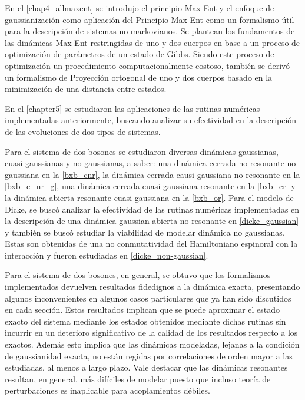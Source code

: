 \documentclass{report} %
\numberwithin{equation}{section}
\begin{document}
En el \autoref{chap4_allmaxent} se introdujo el principio Max-Ent y el enfoque de gaussianización como aplicación del Principio Max-Ent como un formalismo útil para la descripción de sistemas no markovianos. Se plantean los fundamentos de las dinámicas Max-Ent restringidas de uno y dos cuerpos en base a un proceso de optimización de parámetros de un estado de Gibbs. Siendo este proceso de optimización un procedimiento computacionalmente costoso, también se derivó un formalismo de Proyección ortogonal de uno y dos cuerpos basado en la minimización de una distancia entre estados. 

En el \autoref{chapter5} se estudiaron las aplicaciones de las rutinas numéricas implementadas anteriormente, buscando analizar su efectividad en la descripción de las evoluciones de dos tipos de sistemas.

Para el sistema de dos bosones se estudiaron diversas dinámicas gaussianas, cuasi-gaussianas y no gaussianas, a saber: una dinámica cerrada no resonante no gaussiana en la \autoref{bxb_cnr}, la dinámica cerrada causi-gaussiana no resonante en la \autoref{bxb_c_nr_g}, una dinámica cerrada cuasi-gaussiana resonante en la  \autoref{bxb_cr} y la dinámica abierta resonante cuasi-gaussiana en la  \autoref{bxb_or}. Para el modelo de Dicke, se buscó analizar la efectividad de las rutinas numéricas implementadas en la descripción de una dinámica gaussian abierta no resonante en \autoref{dicke_gaussian} y también se buscó estudiar la viabilidad de modelar dinámica no gaussianas. Estas son obtenidas de una no conmutatividad del Hamiltoniano espinoral con la interacción y fueron estudiadas en  \autoref{dicke_non-gaussian}.

Para el sistema de dos bosones, en general, se obtuvo que los formalismos implementados devuelven resultados fidedignos a la dinámica exacta, presentando algunos inconvenientes en algunos casos particulares que ya han sido discutidos en cada sección. Estos resultados implican que se puede aproximar el estado exacto del sistema mediante los estados obtenidos mediante dichas rutinas sin incurrir en un deterioro significativo de la calidad de los resultados respecto a los exactos. Además esto implica que las dinámicas modeladas, lejanas a la condición de gaussianidad exacta, no están regidas por correlaciones de orden mayor a las estudiadas, al menos a largo plazo. Vale destacar que las dinámicas resonantes resultan, en general, más difíciles de modelar puesto que incluso teoría de perturbaciones es inaplicable para acoplamientos débiles.
\end{document}
